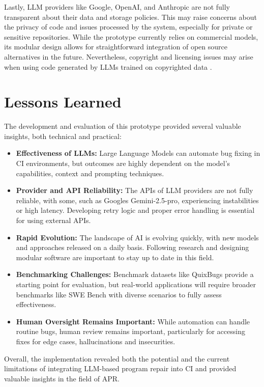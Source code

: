 Lastly, \ac{LLM} providers like Google, OpenAI, and Anthropic are not fully transparent about their data and storage policies. This may raise concerns about the privacy of code and issues processed by the system, especially for private or sensitive repositories. While the prototype currently relies on commercial models, its modular design allows for straightforward integration of open source alternatives in the future. Nevertheless, copyright and licensing issues may arise when using code generated by \acp{LLM} trained on copyrighted data \cite{sauvolaFutureSoftwareDevelopment2024, houLargeLanguageModels2024}.

\section{Lessons Learned}
The development and evaluation of this prototype provided several valuable insights, both technical and practical:

\begin{itemize}
    \item \textbf{Effectiveness of \acp{LLM}:} Large Language Models can automate bug fixing in CI environments, but outcomes are highly dependent on the model's capabilities, context and prompting techniques.
    \item \textbf{Provider and API Reliability:} The \acp{API} of \ac{LLM} providers are not fully reliable, with some, such as Googles Gemini-2.5-pro, experiencing instabilities or high latency. Developing retry logic and proper error handling is essential for using external \acp{API}.
    \item \textbf{Rapid Evolution:} The landscape of AI is evolving quickly, with new models and approaches released on a daily basis. Following research and designing modular software are important to stay up to date in this field.
    \item \textbf{Benchmarking Challenges:} Benchmark datasets like QuixBugs provide a starting point for evaluation, but real-world applications will require broader benchmarks like SWE Bench with diverse scenarios to fully assess effectiveness.
    \item \textbf{Human Oversight Remains Important:} While automation can handle routine bugs, human review remains important, particularly for accessing fixes for edge cases, hallucinations and insecurities.
\end{itemize}

Overall, the implementation revealed both the potential and the current limitations of integrating LLM-based program repair into CI and provided valuable insights in the field of \ac{APR}.



